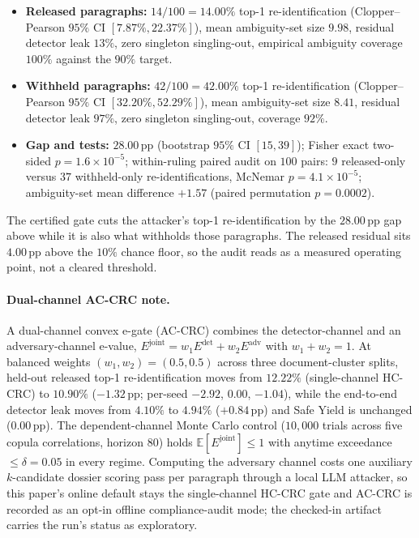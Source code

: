 \documentclass{article}
\begin{document}
\begin{itemize}
    \item \textbf{Released paragraphs:} $14/100 = \mathbf{14.00\%}$ top-1 re-identification (Clopper--Pearson $95\%$ CI $[7.87\%, 22.37\%]$), mean ambiguity-set size $9.98$, residual detector leak $13\%$, zero singleton singling-out, empirical ambiguity coverage $100\%$ against the $90\%$ target.
    \item \textbf{Withheld paragraphs:} $42/100 = \mathbf{42.00\%}$ top-1 re-identification (Clopper--Pearson $95\%$ CI $[32.20\%, 52.29\%]$), mean ambiguity-set size $8.41$, residual detector leak $97\%$, zero singleton singling-out, coverage $92\%$.
    \item \textbf{Gap and tests:} $28.00$\,pp (bootstrap $95\%$ CI $[15, 39]$); Fisher exact two-sided $p = 1.6\times 10^{-5}$; within-ruling paired audit on $100$ pairs: $9$ released-only versus $37$ withheld-only re-identifications, McNemar $p = 4.1\times 10^{-5}$; ambiguity-set mean difference $+1.57$ (paired permutation $p{=}0.0002$).
\end{itemize}

The certified gate cuts the attacker's top-1 re-identification by the $28.00$\,pp gap above while it is also what withholds those paragraphs. The released residual sits $4.00$\,pp above the $10\%$ chance floor, so the audit reads as a measured operating point, not a cleared threshold.

\paragraph{Dual-channel AC-CRC note.} A dual-channel convex e-gate (AC-CRC) combines the detector-channel and an adversary-channel e-value, $E^{\text{joint}} = w_1 E^{\text{det}} + w_2 E^{\text{adv}}$ with $w_1 + w_2 = 1$. At balanced weights $(w_1, w_2) = (0.5, 0.5)$ across three document-cluster splits, held-out released top-1 re-identification moves from $12.22\%$ (single-channel HC-CRC) to $10.90\%$ ($-1.32$\,pp; per-seed $-2.92$, $0.00$, $-1.04$), while the end-to-end detector leak moves from $4.10\%$ to $4.94\%$ ($+0.84$\,pp) and Safe Yield is unchanged ($0.00$\,pp). The dependent-channel Monte Carlo control ($10{,}000$ trials across five copula correlations, horizon $80$) holds $\mathbb{E}[E^{\text{joint}}] \le 1$ with anytime exceedance $\le \delta{=}0.05$ in every regime. Computing the adversary channel costs one auxiliary $k$-candidate dossier scoring pass per paragraph through a local LLM attacker, so this paper's online default stays the single-channel HC-CRC gate and AC-CRC is recorded as an opt-in offline compliance-audit mode; the checked-in artifact carries the run's status as exploratory.
\end{document}

